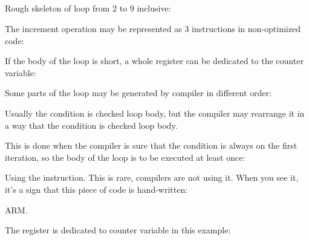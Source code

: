 ﻿\subsection{\Conclusion{}}

Rough skeleton of loop from 2 to 9 inclusive:



The increment operation may be represented as 3 instructions in non-optimized code:



If the body of the loop is short, a whole register can be dedicated to the counter variable:



Some parts of the loop may be generated by compiler in different order:



Usually the condition is checked  loop body, but the compiler may rearrange it in a way that
the condition is checked  loop body.

This is done when the compiler is sure that the condition is always  on the first iteration, 
so the body of the loop is to be executed at least once:




Using the  instruction. This is rare, compilers are not using it.
When you see it, it's a sign that this piece of code is hand-written:



ARM. 

The  register is dedicated to counter variable in this example:




